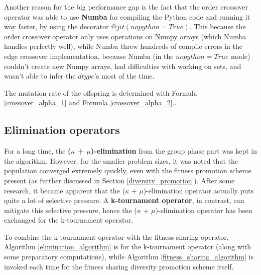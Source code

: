 \documentclass[a4paper,10pt]{article}
\newcommand{\ReplaceMe}[1]{{\color{blue}#1}}
\begin{document}
Another reason for the big performance gap is the fact that the order crossover operator was able to use \textbf{Numba} for compiling the Python code and running it way faster, by using the decorator $@jit(nopython=True)$. This because the order crossover operator only uses operations on Numpy arrays (which Numba handles perfectly well), while Numba threw hundreds of compile errors in the edge crossover implementation, because Numba (in the $nopython=True$ mode) couldn't create new Numpy arrays, had difficulties with working on sets, and wasn't able to infer the $dtype$'s most of the time.

The mutation rate of the offspring is determined with Formula \ref{crossover_alpha_1} and Formula \ref{crossover_alpha_2}..

\subsection{Elimination operators}
\label{elimination}
For a long time, the \textbf{($\kappa$ + $\mu$)-elimination} from the group phase part was kept in the algorithm. However, for the smaller problem sizes, it was noted that the population converged extremely quickly, even with the fitness promotion scheme present (as further discussed in Section \ref{diversity_promotion}). After some research, it became apparent that the ($\kappa$ + $\mu$)-elimination operator actually puts quite a lot of selective pressure. A \textbf{k-tournament operator}, in contrast, can mitigate this selective pressure, hence the ($\kappa$ + $\mu$)-elimination operator has been exchanged for the k-tournament operator.

To combine the k-tournament operator with the fitness sharing operator, Algorithm \ref{elimination_algorithm} is for the k-tournament operator (along with some preparatory computations), while Algorithm \ref{fitness_sharing_algorithm} is invoked each time for the fitness sharing diversity promotion scheme itself.
\end{document}
